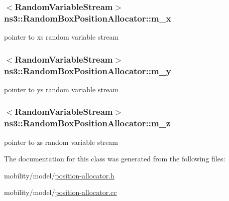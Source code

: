 \subsubsection[{\texorpdfstring{m\+\_\+x}{m_x}}]{$<${\bf Random\+Variable\+Stream}$>$ ns3\+::\+Random\+Box\+Position\+Allocator\+::m\+\_\+x\hspace{0.3cm}{\ttfamily [private]}}\hypertarget{classns3_1_1RandomBoxPositionAllocator_a1675033587eb56a97312c9e3329564f4}{}\label{classns3_1_1RandomBoxPositionAllocator_a1675033587eb56a97312c9e3329564f4}


pointer to x\textquotesingle{}s random variable stream 

\subsubsection[{\texorpdfstring{m\+\_\+y}{m_y}}]{$<${\bf Random\+Variable\+Stream}$>$ ns3\+::\+Random\+Box\+Position\+Allocator\+::m\+\_\+y\hspace{0.3cm}{\ttfamily [private]}}\hypertarget{classns3_1_1RandomBoxPositionAllocator_a2b3aaf0c1950991dba4fc1716d7690cd}{}\label{classns3_1_1RandomBoxPositionAllocator_a2b3aaf0c1950991dba4fc1716d7690cd}


pointer to y\textquotesingle{}s random variable stream 

\subsubsection[{\texorpdfstring{m\+\_\+z}{m_z}}]{$<${\bf Random\+Variable\+Stream}$>$ ns3\+::\+Random\+Box\+Position\+Allocator\+::m\+\_\+z\hspace{0.3cm}{\ttfamily [private]}}\hypertarget{classns3_1_1RandomBoxPositionAllocator_af99b35deb9b0bb4b85dd07495377b5be}{}\label{classns3_1_1RandomBoxPositionAllocator_af99b35deb9b0bb4b85dd07495377b5be}


pointer to z\textquotesingle{}s random variable stream 



The documentation for this class was generated from the following files\+:\begin{DoxyCompactItemize}
\item 
mobility/model/\hyperlink{position-allocator_8h}{position-\/allocator.\+h}\item 
mobility/model/\hyperlink{position-allocator_8cc}{position-\/allocator.\+cc}\end{DoxyCompactItemize}
